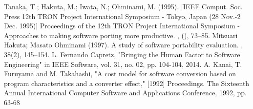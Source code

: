 \documentclass[conference]{IEEEtran}
\begin{document}
\begin{thebibliography}{00}
 Tanaka, T.; Hakuta, M.; Iwata, N.; Ohminami, M. (1995). [IEEE Comput. Soc. Press 12th TRON Project International Symposium - Tokyo, Japan (28 Nov.-2 Dec. 1995)] Proceedings of the 12th TRON Project International Symposium - Approaches to making software porting more productive. , (), 73–85.
 Mitsuari Hakuta; Masato Ohminami (1997). A study of software portability evaluation. , 38(2), 145–154.
 L. Fernando Capretz, "Bringing the Human Factor to Software Engineering" in IEEE Software, vol. 31, no. 02, pp. 104-104, 2014.
 A. Kanai, T. Furuyama and M. Takahashi, "A cost model for software conversion based on program characteristics and a converter effect," [1992] Proceedings. The Sixteenth Annual International Computer Software and Applications Conference, 1992, pp. 63-68
\end{thebibliography}
\end{document}

